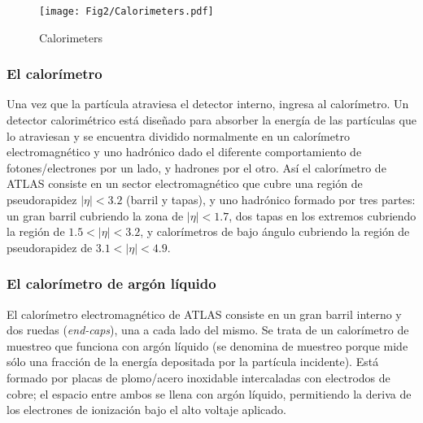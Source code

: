 \begin{figure}[htbp]
  \begin{center}
      \texttt{[image: Fig2/Calorimeters.pdf]}
    \caption{Calorimeters}
    \label{fig:figcalo}
  \end{center}
\end{figure}

\subsubsection{El calor\'imetro}

   Una vez que la part\'icula atraviesa el detector interno, ingresa al calor\'imetro. Un detector calorim\'etrico est\'a dise\~nado para absorber la energ\'ia de las part\'iculas que lo atraviesan y se encuentra dividido normalmente en un calor\'imetro electromagn\'etico y uno hadr\'onico dado el diferente comportamiento de fotones/electrones por un lado, y hadrones por el otro.  As\'i el calor\'imetro de ATLAS consiste en un sector electromagn\'etico que cubre una regi\'on de pseudorapidez $|\eta|<3.2$ (barril y tapas),  y uno hadr\'onico formado por tres partes: un gran barril cubriendo la zona de $|\eta|<1.7$, dos tapas en los extremos cubriendo la regi\'on de $1.5<|\eta|<3.2$, y calor\'imetros de bajo \'angulo cubriendo la regi\'on de pseudorapidez de  $3.1 <|\eta|< 4.9$. %

\subsubsection{El calor\'imetro de arg\'on l\'iquido}
  
   El calor\'imetro electromagn\'etico de ATLAS consiste en un gran barril interno y dos ruedas (\emph{end-caps}), una a cada lado del mismo. Se trata de un calor\'imetro de muestreo que funciona con arg\'on l\'iquido (se denomina de muestreo porque mide s\'olo una fracci\'on de la energ\'ia depositada por la part\'icula incidente). Est\'a formado por placas de plomo/acero inoxidable intercaladas con electrodos de cobre; el espacio entre ambos se llena con arg\'on l\'iquido, permitiendo la deriva de los electrones de ionizaci\'on bajo el alto voltaje aplicado. 


